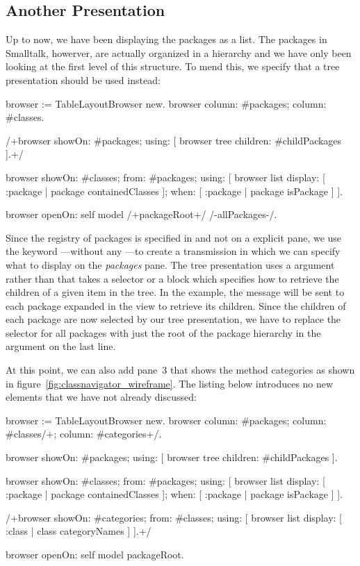 \documentclass[a4paper,10pt,twoside]{book}
\begin{document}
\subsection{Another Presentation}

Up to now, we have been displaying the packages as a list. The packages in Smalltalk, howerver, are actually organized in a hierarchy and we have only been looking at the first level of this structure. To mend this, we specify that a tree presentation should be used instead:

\begin{code}{}
browser := TableLayoutBrowser new.
browser
	column: #packages;
	column: #classes.	

/+browser showOn: #packages; using: [
	browser tree
		children: #childPackages
].+/

browser showOn: #classes; from: #packages; using: [
	browser list
		display: [ :package | package containedClasses ];
		when: [ :package | package isPackage ]
].

browser openOn: self model /+packageRoot+/ /-allPackages-/.
\end{code}

Since the registry of packages is specified in  and not on a explicit pane, we use the keyword ---without any ---to create a transmission in which we can specify what to display on the \emph{packages} pane. The tree presentation uses a  argument rather than  that takes a selector or a block which specifies how to retrieve the children of a given item in the tree. In the example, the message  will be sent to each package expanded in the view to retrieve its children. Since the children of each package are now selected by our tree presentation, we have to replace the selector for all packages with just the root of the package hierarchy in the  argument on the last line.

At this point, we can also add pane~3 that shows the method categories as shown in figure~\ref{fig:classnavigator_wireframe}. The listing below introduces no new elements that we have not already discussed:

\begin{code}{}
browser := TableLayoutBrowser new.
browser
	column: #packages;
	column: #classes/+;
	column: #categories+/.	

browser showOn: #packages; using: [
	browser tree
		children: #childPackages
].

browser showOn: #classes; from: #packages; using: [
	browser list
		display: [ :package | package containedClasses ];
		when: [ :package | package isPackage ]
].

/+browser showOn: #categories; from: #classes; using: [
	browser list
		display: [ :class | class categoryNames ]
].+/

browser openOn: self model packageRoot.
\end{code} 
\end{document}
